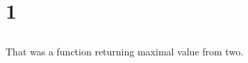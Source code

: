 \chapter{ 1}

\section{}

{That was a function returning maximal value from two}.

\section{}

\href{http://yurichev.com/RE-exercise-solutions/1/4/password1.c}{}

